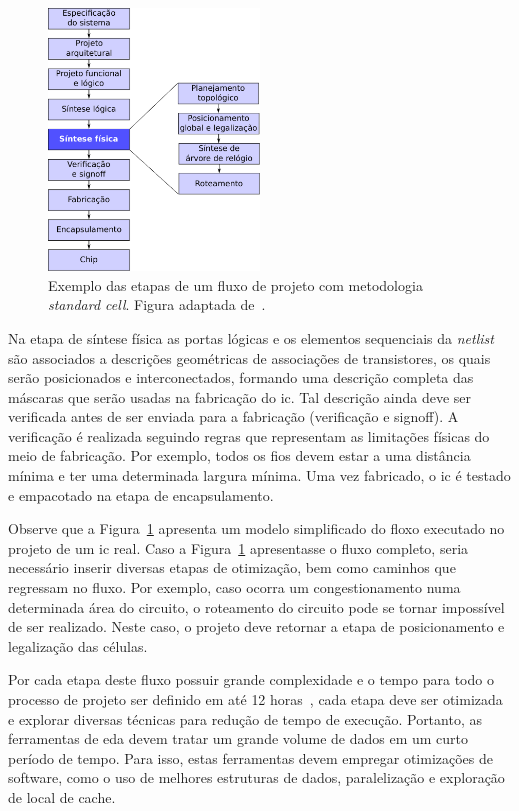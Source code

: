 \begin{figure}[]
    \centering
    \includegraphics[width=0.5\textwidth]{img/introducao/exemplo_fluxo.pdf}
    \caption[Etapas do fluxo \textit{standard cell}.]{Exemplo das etapas de um fluxo de projeto com metodologia \textit{standard cell}. Figura adaptada de~.}
    \label{fig:exemplo_fluxo}
\end{figure}

Na etapa de síntese física as portas lógicas e os elementos sequenciais da \textit{netlist} são associados a descrições geométricas de associações de transistores, os quais serão posicionados e interconectados, formando uma descrição completa das máscaras que serão usadas na fabricação do \ac{ic}.
Tal descrição ainda deve ser verificada antes de ser enviada para a fabricação (verificação e signoff).
A verificação é realizada seguindo regras que representam as limitações físicas do meio de fabricação.
Por exemplo, todos os fios devem estar a uma distância mínima e ter uma determinada largura mínima.
Uma vez fabricado, o \ac{ic} é testado e empacotado na etapa de encapsulamento.

Observe que a Figura~\ref{fig:exemplo_fluxo} apresenta um modelo simplificado do floxo executado no projeto de um \ac{ic} real.
Caso a Figura~\ref{fig:exemplo_fluxo} apresentasse o fluxo completo, seria necessário inserir diversas etapas de otimização, bem como caminhos que regressam no fluxo.
Por exemplo, caso ocorra um congestionamento numa determinada área do circuito, o roteamento do circuito pode se tornar impossível de ser realizado. Neste caso,  o projeto deve retornar a etapa de posicionamento e legalização das células.

Por cada etapa deste fluxo possuir grande complexidade e o tempo para todo o processo de projeto ser definido em até 12 horas~\cite{papa2011physical}, cada etapa deve ser otimizada e explorar diversas técnicas para redução de tempo de execução.
Portanto, as ferramentas de \ac{eda} devem tratar um grande volume de dados em um curto período de tempo.
Para isso, estas ferramentas devem empregar otimizações de software, como o uso de melhores estruturas de dados, paralelização e exploração de local de cache.

